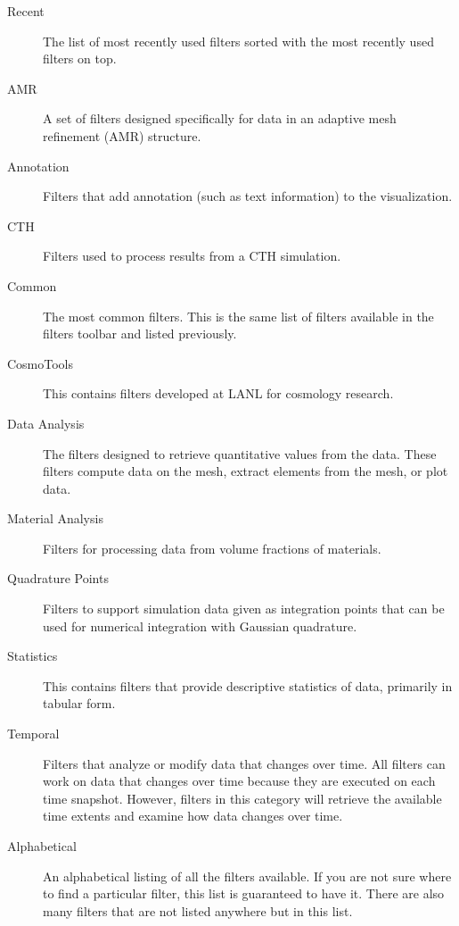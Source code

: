 \begin{description}
\item[Recent] The list of most recently used filters sorted with the most
  recently used filters on top.  
\item[AMR] A set of filters designed specifically for data in an adaptive
  mesh refinement (AMR)  structure. 
\item[Annotation] Filters that add annotation (such as text information) to
  the visualization. 
\item[CTH] Filters used to process results from a CTH  simulation.
\item[Common] The most common filters.  This is the same list of filters
  available in the filters toolbar and listed previously.
   
\item[CosmoTools] This contains filters developed at LANL for cosmology
  research.  
\item[Data Analysis] The filters designed to retrieve quantitative values
  from the data.  These filters compute data on the mesh, extract elements
  from the mesh, or plot data. 
\item[Material Analysis] Filters for processing data from volume fractions
  of materials. 
\item[Quadrature Points] Filters to support simulation data given as
  integration points that can be used for numerical integration with
  Gaussian quadrature. 
\item[Statistics] This contains filters that provide descriptive
  statistics of data, primarily in tabular form. 
\item[Temporal] Filters that analyze or modify data that changes over time.
  All filters can work on data that changes over time because they are
  executed on each time snapshot.  However, filters in this category will
  retrieve the available time extents and examine how data changes over
  time.  
\item[Alphabetical] An alphabetical listing of all the filters available.
  If you are not sure where to find a particular filter, this list is
  guaranteed to have it.  There are also many filters that are not listed
  anywhere but in this list.
\end{description}

